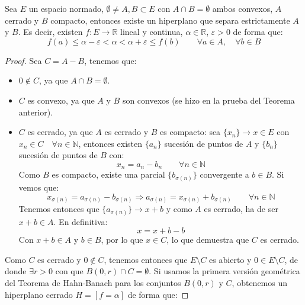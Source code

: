 \begin{teo}
    Sea $E$ un espacio normado, $\emptyset \neq A, B\subset E$ con $A\cap B=\emptyset $ ambos convexos, $A$ cerrado y $B$ compacto, entonces existe un hiperplano que separa estrictamente $A$ y $B$. Es decir, existen $f:E\to \mathbb{R}$ lineal y continua, $\alpha\in \mathbb{R}$, $\varepsilon>0$ de forma que:
    \begin{equation*}
        f(a) \leq \alpha - \varepsilon < \alpha < \alpha + \varepsilon \leq f(b) \qquad \forall a\in A, \quad \forall b\in B
    \end{equation*}
    \begin{proof}
        Sea $C=A-B$, tenemos que:
        \begin{itemize}
            \item $0\notin C$, ya que $A\cap B = \emptyset $.
            \item $C$ es convexo, ya que $A$ y $B$ son convexos (se hizo en la prueba del Teorema anterior).
            \item $C$ es cerrado, ya que $A$ es cerrado y $B$ es compacto: sea $\{x_n\}\to x\in E$ con $x_n \in C \quad \forall n\in \mathbb{N}$, entonces existen $\{a_n\}$ sucesión de puntos de $A$ y $\{b_n\}$ sucesión de puntos de $B$ con:
                \begin{equation*}
                    x_n = a_n - b_n \qquad \forall n\in \mathbb{N}
                \end{equation*}
                Como $B$ es compacto, existe una parcial $\{b_{\sigma(n)}\}$ convergente a $b\in B$. Si vemos que:
                \begin{equation*}
                    x_{\sigma(n)} = a_{\sigma(n)} - b_{\sigma(n)} \Longrightarrow a_{\sigma(n)} = x_{\sigma(n)} + b_{\sigma(n)} \qquad \forall n\in \mathbb{N}
                \end{equation*}
                Tenemos entonces que $\{a_{\sigma(n)}\} \to x + b$ y como $A$ es cerrado, ha de ser $x+b\in A$. En definitiva:
                \begin{equation*}
                    x = x + b - b
                \end{equation*}
                Con $x+b\in A$ y $b\in B$, por lo que $x\in C$, lo que demuestra que $C$ es cerrado.
        \end{itemize}
        Como $C$ es cerrado y $0\notin C$, tenemos entonces que $E\setminus C$ es abierto y $0\in E\setminus C$, de donde $\exists r>0$ con que $B(0,r)\cap C = \emptyset $. Si usamos la primera versión geométrica del Teorema de Hahn-Banach para los conjuntos $B(0,r)$ y $C$, obtenemos un hiperplano cerrado $H=[f=\alpha]$ de forma que:

\end{proof}
\end{teo}
